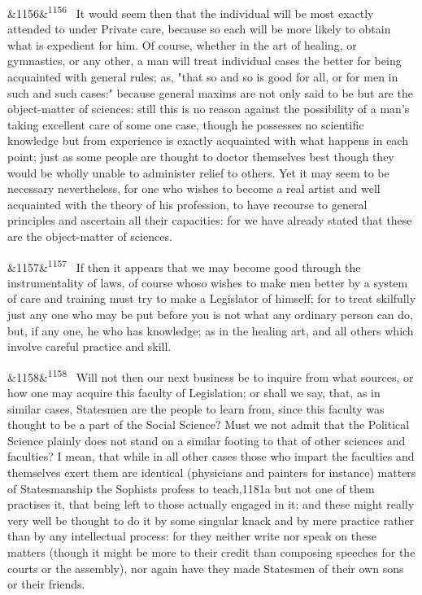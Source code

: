 \documentclass[12pt]{article}
\newcommand{\para}[1][]{\par\noindent\ifx&#1&\else\textsuperscript{\footnotesize #1}~\fi}
\begin{document}
\para[1156] It would seem then that the individual will be most exactly attended to under Private care, because so each will be more likely to obtain what is expedient for him. Of course, whether in the art of healing, or gymnastics, or any other, a man will treat individual cases the better for being acquainted with general rules; as, "that so and so is good for all, or for men in such and such cases:" because general maxims are not only said to be but are the object-matter of sciences: still this is no reason against the possibility of a man's taking excellent care of some one case, though he possesses no scientific knowledge but from experience is exactly acquainted with what happens in each point; just as some people are thought to doctor themselves best though they would be wholly unable to administer relief to others. Yet it may seem to be necessary nevertheless, for one who wishes to become a real artist and well acquainted with the theory of his profession, to have recourse to general principles and ascertain all their capacities: for we have already stated that these are the object-matter of sciences.

\para[1157] If then it appears that we may become good through the instrumentality of laws, of course whoso wishes to make men better by a system of care and training must try to make a Legislator of himself; for to treat skilfully just any one who may be put before you is not what any ordinary person can do, but, if any one, he who has knowledge; as in the healing art, and all others which involve careful practice and skill.

\para[1158] Will not then our next business be to inquire from what sources, or how one may acquire this faculty of Legislation; or shall we say, that, as in similar cases, Statesmen are the people to learn from, since this faculty was thought to be a part of the Social Science? Must we not admit that the Political Science plainly does not stand on a similar footing to that of other sciences and faculties? I mean, that while in all other cases those who impart the faculties and themselves exert them are identical (physicians and painters for instance) matters of Statesmanship the Sophists profess to teach,1181a but not one of them practises it, that being left to those actually engaged in it: and these might really very well be thought to do it by some singular knack and by mere practice rather than by any intellectual process: for they neither write nor speak on these matters (though it might be more to their credit than composing speeches for the courts or the assembly), nor again have they made Statesmen of their own sons or their friends.
\end{document}
